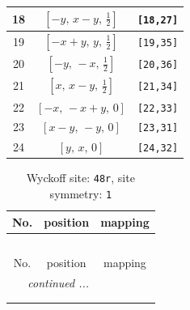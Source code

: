 \documentclass[fleqn,8pt]{jsarticle}
\begin{document}
\begin{longtable}{ccc}
18 & $\left[ - y,\, x - y,\, \frac{1}{2} \right]$ & {\tt [18,27]} \\ \hline
19 & $\left[ - x + y,\, y,\, \frac{1}{2} \right]$ & {\tt [19,35]} \\ \hline
20 & $\left[ - y,\, - x,\, \frac{1}{2} \right]$ & {\tt [20,36]} \\ \hline
21 & $\left[ x,\, x - y,\, \frac{1}{2} \right]$ & {\tt [21,34]} \\ \hline
22 & $\left[ - x,\, - x + y,\, 0 \right]$ & {\tt [22,33]} \\ \hline
23 & $\left[ x - y,\, - y,\, 0 \right]$ & {\tt [23,31]} \\ \hline
24 & $\left[ y,\, x,\, 0 \right]$ & {\tt [24,32]} \\
\end{longtable}
\renewcommand{\arraystretch}{1.2}
\begin{longtable}{ccc}
\caption{Wyckoff site: {\tt 48r}, site symmetry: {\tt 1}}
 \\
 \hline \hline
No. & position & mapping \\ \hline \endfirsthead

\multicolumn{2}{l}{\tablename\ \thetable{}} \\
 \hline \hline
No. & position & mapping \\ \hline \endhead

 \hline \hline
\multicolumn{2}{r}{\footnotesize\it continued ...} \\ \endfoot

 \hline \hline
\multicolumn{2}{r}{} \\ \endlastfoot


\end{longtable}
\end{document}
